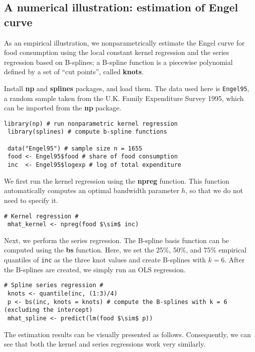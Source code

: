 \documentclass[11pt, A4paper, openany, uplatex]{book}
\begin{document}
\subsection{A numerical illustration: estimation of Engel curve}

As an empirical illustration, we nonparametrically estimate the Engel curve for food consumption using the local constant kernel regression and the series regression based on B-splines; a B-spline function is a piecewise polynomial defined by a set of ``cut points'', called \textbf{knots}.

Install \textbf{np} and \textbf{splines} packages, and load them.
The data used here is \texttt{Engel95}, a random sample taken from the U.K. Family Expenditure Survey 1995, which can be imported from the \textbf{np} package.

\begin{lstlisting}[basicstyle=\ttfamily\footnotesize, frame=single]
 library(np) # run nonparametric kernel regression
 library(splines) # compute b-spline functions

 data("Engel95") # sample size n = 1655
 food <- Engel95$food # share of food consumption
 inc  <- Engel95$logexp # log of total expenditure 
\end{lstlisting}

We first run the kernel regression using the \textbf{npreg} function.
This function automatically computes an optimal bandwidth parameter $h$, so that we do not need to specify it.

\begin{lstlisting}[basicstyle=\ttfamily\footnotesize, frame=single]
# Kernel regression #
 mhat_kernel <- npreg(food $\sim$ inc)
\end{lstlisting}

Next, we perform the series regression.
The B-spline basis function can be computed using the \textbf{bs} function.
Here, we set the 25\%, 50\%, and 75\% empirical quantiles of \texttt{inc} as the three knot values and create B-splines with $k = 6$.
After the B-splines are created, we simply run an OLS regression.

\begin{lstlisting}[basicstyle=\ttfamily\footnotesize, frame=single]
# Spline series regression #
 knots <- quantile(inc, (1:3)/4)
 p <- bs(inc, knots = knots) # compute the B-splines with k = 6 (excluding the intercept)
 mhat_spline <- predict(lm(food $\sim$ p))
\end{lstlisting}

The estimation results can be visually presented as follows.
Consequently, we can see that both the kernel and series regressions work very similarly.
\end{document}
